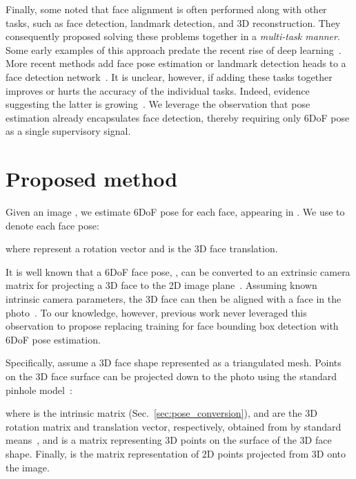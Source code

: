 \documentclass[final]{cvpr}
\begin{document}
Finally, some noted that face alignment is often performed along with other tasks, such as face detection, landmark detection, and 3D reconstruction. They consequently proposed solving these problems together in a {\em multi-task manner}. Some early examples of this approach predate the recent rise of deep learning~\cite{osadchy2007synergistic,osadchy2004synergistic}. More recent methods add face pose estimation or landmark detection heads to a face detection network~\cite{chang2019deep, kepler, hyperface, ranjan2017all, zhu2012face}. It is unclear, however, if adding these tasks together improves or hurts the accuracy of the individual tasks. Indeed, evidence suggesting the latter is growing~\cite{lu2017fully,tran2019transferability,zhao2018modulation}. We leverage the observation that pose estimation already encapsulates face detection, thereby requiring only 6DoF pose as a single supervisory signal.



\section{Proposed method}\label{sec:method}
Given an image , we estimate 6DoF pose for each face,  appearing in . We use  to denote each face pose: 

where  represent a rotation vector \cite{trucco1998introductory} and  is the 3D face translation.

It is well known that a 6DoF face pose, , can be converted to an extrinsic camera matrix for projecting a 3D face to the 2D image plane~\cite{forsyth2002computer,szeliski2010computer}. Assuming known intrinsic camera parameters, the 3D face can then be aligned with a face in the photo~\cite{hassner2013viewing,hassner2015effective}. To our knowledge, however, previous work never leveraged this observation to propose replacing training for face bounding box detection with 6DoF pose estimation. 


Specifically, assume a 3D face shape represented as a triangulated mesh. Points on the 3D face surface can be projected down to the photo using the standard pinhole model~\cite{hartley2003multiple}:

 where  is the intrinsic matrix (Sec.~\ref{sec:pose_conversion}),  and  are the 3D rotation matrix and translation vector, respectively, obtained from  by standard means~\cite{forsyth2002computer,szeliski2010computer}, and  is a matrix representing  3D points on the surface of the 3D face shape. Finally,  is the matrix representation of 2D points projected from 3D onto the image. 
\end{document}
